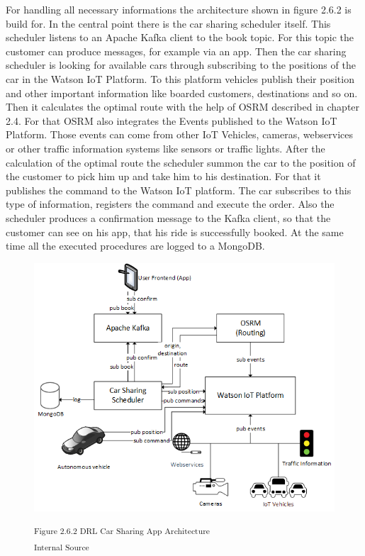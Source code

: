For handling all necessary informations the architecture shown in figure 2.6.2 is build for. In the central point there is the car sharing scheduler itself. This scheduler listens to an Apache Kafka client to the book topic. For this topic the customer can produce messages, for example via an app. Then the car sharing scheduler is looking for available cars through subscribing to the positions of the car in the Watson IoT Platform. To this platform vehicles publish their position and other important information like boarded customers, destinations and so on. Then it calculates the optimal route with the help of OSRM described in chapter 2.4. For that OSRM also integrates the Events published to the Watson IoT Platform. Those events can come from other IoT Vehicles, cameras, webservices or other traffic information systems like sensors or traffic lights. After the calculation of the optimal route the scheduler summon the car to the position of the customer to pick him up and take him to his destination. For that it publishes the command to the Watson IoT platform. The car subscribes to this type of information, registers the command and execute the order. Also the scheduler produces a confirmation message to the Kafka client, so that the customer can see on his app, that his ride is successfully booked. At the same time all the executed procedures are logged to a MongoDB.

\begin{figure}[h]
\centering
\includegraphics[width=\textwidth/5*4]{images/car_sharing_architecture.png}

\textsuperscript{Figure 2.6.2 DRL Car Sharing App Architecture}\\
\textsuperscript{Internal Source}
\end{figure}

